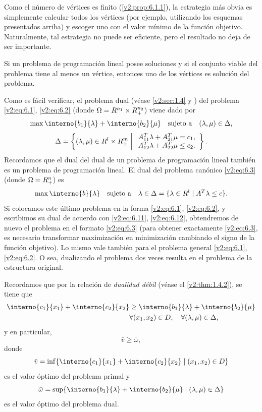 Como el número de vértices es finito (\cref{v2:prop:6.1.1}), la estrategia más obvia es simplemente calcular todos los vértices (por ejemplo, utilizando los esquemas presentados arriba) y escoger uno con el valor mínimo de la función objetivo. Naturalmente, tal estrategia no puede ser eficiente, pero el resultado no deja de ser importante.

\begin{theorem}\label{v2:thm:6.1.6}
    Si un problema de programación lineal posee soluciones y si el conjunto viable del problema tiene al menos un vértice, entonces uno de los vértices es solución del problema.
\end{theorem}

Como es fácil verificar, el problema dual (véase \cref{v2:sec:1.4} y \cite[\S 5.1]{SolodovVol1}) del problema \eqref{v2:eq:6.1}, \eqref{v2:eq:6.2} (donde $\Omega = R^{n_1} \times R^{n_2}_+$) viene dado por
\begin{equation}
    \max \interno{b_1}{\lambda} + \interno{b_2}{\mu} \quad \text{sujeto a} \quad (\lambda, \mu) \in \Delta,
    \label{v2:eq:6.11}
\end{equation}
\begin{equation}
    \Delta = \left\{ (\lambda, \mu) \in R^l \times R^m_+ \;\middle|\; \begin{array}{l} A_{11}^T \lambda + A_{21}^T \mu = c_1, \\ A_{12}^T \lambda + A_{22}^T \mu \le c_2. \end{array} \right\}.
    \label{v2:eq:6.12}
\end{equation}
Recordamos que el dual del dual de un problema de programación lineal también es un problema de programación lineal.
El dual del problema canónico \eqref{v2:eq:6.3} (donde $\Omega = R^n_+$) es
\[
    \max \interno{b}{\lambda} \quad \text{sujeto a} \quad \lambda \in \Delta = \{ \lambda \in \R^l \mid A^T \lambda \le c \}.
\]
Si colocamos este último problema en la forma \eqref{v2:eq:6.1}, \eqref{v2:eq:6.2}, y escribimos su dual de acuerdo con \eqref{v2:eq:6.11}, \eqref{v2:eq:6.12}, obtendremos de nuevo el problema en el formato \eqref{v2:eq:6.3} (para obtener exactamente \eqref{v2:eq:6.3}, es necesario transformar maximización en minimización cambiando el signo de la función objetivo). Lo mismo vale también para el problema general \eqref{v2:eq:6.1}, \eqref{v2:eq:6.2}. O sea, dualizando el problema dos veces resulta en el problema de la estructura original.

Recordamos que por la relación de \textit{dualidad débil} (véase el \cref{v2:thm:1.4.2}), se tiene que
\begin{align}
    \interno{c_1}{x_1} + \interno{c_2}{x_2} &\ge \interno{b_1}{\lambda} + \interno{b_2}{\mu} \label{v2:eq:6.13} \\
    &\forall (x_1, x_2) \in D, \quad \forall (\lambda, \mu) \in \Delta, \nonumber
\end{align}
y en particular,
\[
    \bar{v} \ge \bar{\omega},
\]
donde
\[
    \bar{v} = \inf \{ \interno{c_1}{x_1} + \interno{c_2}{x_2} \mid (x_1, x_2) \in D \}
\]
es el valor óptimo del problema primal y
\[
    \bar{\omega} = \sup \{ \interno{b_1}{\lambda} + \interno{b_2}{\mu} \mid (\lambda, \mu) \in \Delta \}
\]
es el valor óptimo del problema dual.

